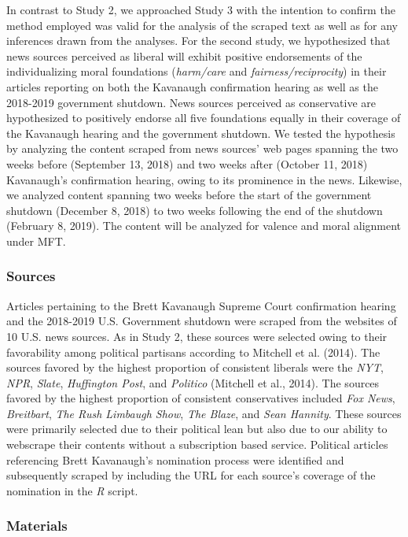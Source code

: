 \documentclass[
  man,floatsintext]{apa6}
\begin{document}
In contrast to Study 2, we approached Study 3 with the intention to
confirm the method employed was valid for the analysis of the scraped
text as well as for any inferences drawn from the analyses. For the
second study, we hypothesized that news sources perceived as liberal
will exhibit positive endorsements of the individualizing moral
foundations (\emph{harm/care} and \emph{fairness/reciprocity}) in their articles
reporting on both the Kavanaugh confirmation hearing as well as the
2018-2019 government shutdown. News sources perceived as conservative
are hypothesized to positively endorse all five foundations equally in
their coverage of the Kavanaugh hearing and the government shutdown. We
tested the hypothesis by analyzing the content scraped from news
sources' web pages spanning the two weeks before (September 13, 2018)
and two weeks after (October 11, 2018) Kavanaugh's confirmation hearing,
owing to its prominence in the news. Likewise, we analyzed content
spanning two weeks before the start of the government shutdown (December
8, 2018) to two weeks following the end of the shutdown (February 8,
2019). The content will be analyzed for valence and moral alignment
under MFT.

\subsubsection{Sources}\label{sources-1}

Articles pertaining to the Brett Kavanaugh Supreme Court confirmation
hearing and the 2018-2019 U.S. Government shutdown were scraped from the
websites of 10 U.S. news sources. As in Study 2, these sources were
selected owing to their favorability among political partisans according
to Mitchell et al. (2014). The sources favored by the highest proportion of
consistent liberals were the \emph{NYT}, \emph{NPR}, \emph{Slate}, \emph{Huffington Post},
and \emph{Politico} (Mitchell et al., 2014). The sources favored by the highest
proportion of consistent conservatives included \emph{Fox News}, \emph{Breitbart},
\emph{The Rush Limbaugh Show}, \emph{The Blaze}, and \emph{Sean Hannity}. These sources
were primarily selected due to their political lean but also due to our
ability to webscrape their contents without a subscription based
service. Political articles referencing Brett Kavanaugh's nomination
process were identified and subsequently scraped by including the URL
for each source's coverage of the nomination in the \emph{R} script.

\subsubsection{Materials}\label{materials-1}
\end{document}
